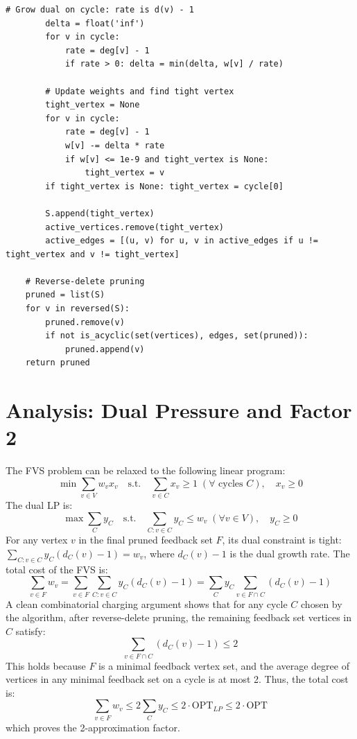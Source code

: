 \begin{lstlisting}[style=python, caption=Primal-Dual Feedback Vertex Set]
        # Grow dual on cycle: rate is d(v) - 1
        delta = float('inf')
        for v in cycle:
            rate = deg[v] - 1
            if rate > 0: delta = min(delta, w[v] / rate)
            
        # Update weights and find tight vertex
        tight_vertex = None
        for v in cycle:
            rate = deg[v] - 1
            w[v] -= delta * rate
            if w[v] <= 1e-9 and tight_vertex is None:
                tight_vertex = v
        if tight_vertex is None: tight_vertex = cycle[0]
        
        S.append(tight_vertex)
        active_vertices.remove(tight_vertex)
        active_edges = [(u, v) for u, v in active_edges if u != tight_vertex and v != tight_vertex]
        
    # Reverse-delete pruning
    pruned = list(S)
    for v in reversed(S):
        pruned.remove(v)
        if not is_acyclic(set(vertices), edges, set(pruned)):
            pruned.append(v)
    return pruned
\end{lstlisting}

\section{Analysis: Dual Pressure and Factor 2}
The FVS problem can be relaxed to the following linear program:
\[
\min \sum_{v \in V} w_v x_v \quad \text{s.t.} \quad \sum_{v \in C} x_v \ge 1 \; (\forall \text{ cycles } C), \quad x_v \ge 0
\]
The dual LP is:
\[
\max \sum_{C} y_C \quad \text{s.t.} \quad \sum_{C: v \in C} y_C \le w_v \; (\forall v \in V), \quad y_C \ge 0
\]
For any vertex $v$ in the final pruned feedback set $F$, its dual constraint is tight: $\sum_{C: v \in C} y_C (d_C(v) - 1) = w_v$, where $d_C(v) - 1$ is the dual growth rate. The total cost of the FVS is:
\[
\sum_{v \in F} w_v = \sum_{v \in F} \sum_{C: v \in C} y_C (d_C(v) - 1) = \sum_{C} y_C \sum_{v \in F \cap C} (d_C(v) - 1)
\]
A clean combinatorial charging argument shows that for any cycle $C$ chosen by the algorithm, after reverse-delete pruning, the remaining feedback set vertices in $C$ satisfy:
\[
\sum_{v \in F \cap C} (d_C(v) - 1) \le 2
\]
This holds because $F$ is a minimal feedback vertex set, and the average degree of vertices in any minimal feedback set on a cycle is at most 2. Thus, the total cost is:
\[
\sum_{v \in F} w_v \le 2 \sum_{C} y_C \le 2 \cdot \text{OPT}_{LP} \le 2 \cdot \text{OPT}
\]
which proves the 2-approximation factor.

